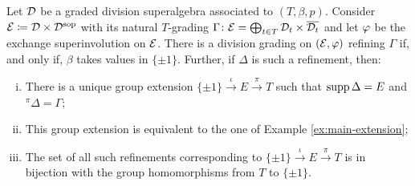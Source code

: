 \begin{thm}\label{thm:refinement-DxDsop}
    Let $\mathcal{D}$ be a graded division superalgebra associated to $(T, \beta, p)$.  
    Consider $\mathcal E \coloneqq \mathcal{D} \times \mathcal{D}^{\mathrm{sop}}$ with its natural $T$-grading $\Gamma\colon \mathcal E = \bigoplus_{t\in T} \mathcal{D}_t \times \overline{\mathcal{D}_t}$ and let $\varphi$ be the exchange superinvolution on $\mathcal E$. 
    There is a division grading on $(\mathcal E, \varphi)$ refining $\Gamma$ if, and only if, $\beta$ takes values in $\{ \pm 1 \}$. 
    Further, if $\Delta$ is such a refinement, then:%
    
    \begin{enumerate}[(i)]
        
        \item %
        There is a unique group extension $\{ \pm 1 \} \xrightarrow{\iota} E \xrightarrow{\pi} T$ such that $\operatorname{supp} \Delta = E$ and ${}^{\pi} \Delta = \Gamma$; \label{item:there-is-extension}
        
        \item This group extension is equivalent to the one of Example \ref{ex:main-extension}; \label{item:equivalent-extension-example}
        
        \item The set of all such refinements corresponding to $\{ \pm 1 \} \xrightarrow{\iota} E \xrightarrow{\pi} T$ is in bijection with the group homomorphisms from $T$ to $\{ \pm 1 \}$. \label{item:number-of-extensions}
    \end{enumerate}
\end{thm}

